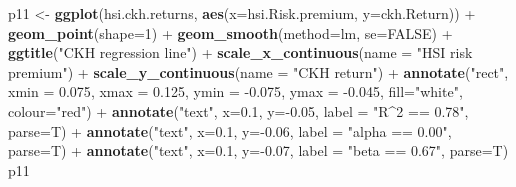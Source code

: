 \documentclass[]{article}
\newenvironment{Shaded}{\begin{snugshade}}{\end{snugshade}}
\newcommand{\KeywordTok}[1]{\textcolor[rgb]{0.13,0.29,0.53}{\textbf{{#1}}}}
\newcommand{\DataTypeTok}[1]{\textcolor[rgb]{0.13,0.29,0.53}{{#1}}}
\newcommand{\DecValTok}[1]{\textcolor[rgb]{0.00,0.00,0.81}{{#1}}}
\newcommand{\FloatTok}[1]{\textcolor[rgb]{0.00,0.00,0.81}{{#1}}}
\newcommand{\StringTok}[1]{\textcolor[rgb]{0.31,0.60,0.02}{{#1}}}
\newcommand{\OtherTok}[1]{\textcolor[rgb]{0.56,0.35,0.01}{{#1}}}
\newcommand{\NormalTok}[1]{{#1}}
\begin{document}
\begin{Shaded}
\begin{Highlighting}[]
\NormalTok{p11 <-}\StringTok{ }\KeywordTok{ggplot}\NormalTok{(hsi.ckh.returns, }\KeywordTok{aes}\NormalTok{(}\DataTypeTok{x=}\NormalTok{hsi.Risk.premium, }\DataTypeTok{y=}\NormalTok{ckh.Return)) +}\StringTok{ }
\StringTok{  }\KeywordTok{geom_point}\NormalTok{(}\DataTypeTok{shape=}\DecValTok{1}\NormalTok{) +}\StringTok{ }\KeywordTok{geom_smooth}\NormalTok{(}\DataTypeTok{method=}\NormalTok{lm, }\DataTypeTok{se=}\OtherTok{FALSE}\NormalTok{) +}
\StringTok{  }\KeywordTok{ggtitle}\NormalTok{(}\StringTok{"CKH regression line"}\NormalTok{) +}
\StringTok{  }\KeywordTok{scale_x_continuous}\NormalTok{(}\DataTypeTok{name =} \StringTok{"HSI risk premium"}\NormalTok{) +}
\StringTok{  }\KeywordTok{scale_y_continuous}\NormalTok{(}\DataTypeTok{name =} \StringTok{"CKH return"}\NormalTok{) +}
\StringTok{  }\KeywordTok{annotate}\NormalTok{(}\StringTok{"rect"}\NormalTok{, }\DataTypeTok{xmin =} \FloatTok{0.075}\NormalTok{, }\DataTypeTok{xmax =} \FloatTok{0.125}\NormalTok{, }\DataTypeTok{ymin =} \NormalTok{-}\FloatTok{0.075}\NormalTok{, }\DataTypeTok{ymax =} \NormalTok{-}\FloatTok{0.045}\NormalTok{, }\DataTypeTok{fill=}\StringTok{"white"}\NormalTok{, }
    \DataTypeTok{colour=}\StringTok{"red"}\NormalTok{) +}\StringTok{ }
\StringTok{  }\KeywordTok{annotate}\NormalTok{(}\StringTok{"text"}\NormalTok{, }\DataTypeTok{x=}\FloatTok{0.1}\NormalTok{, }\DataTypeTok{y=}\NormalTok{-}\FloatTok{0.05}\NormalTok{, }\DataTypeTok{label =} \StringTok{"R^2 == 0.78"}\NormalTok{, }\DataTypeTok{parse=}\NormalTok{T) +}\StringTok{ }\KeywordTok{annotate}\NormalTok{(}\StringTok{"text"}\NormalTok{, }\DataTypeTok{x=}\FloatTok{0.1}\NormalTok{, }\DataTypeTok{y=}\NormalTok{-}\FloatTok{0.06}\NormalTok{, }
    \DataTypeTok{label =} \StringTok{"alpha == 0.00"}\NormalTok{, }\DataTypeTok{parse=}\NormalTok{T) +}\StringTok{ }
\StringTok{  }\KeywordTok{annotate}\NormalTok{(}\StringTok{"text"}\NormalTok{, }\DataTypeTok{x=}\FloatTok{0.1}\NormalTok{, }\DataTypeTok{y=}\NormalTok{-}\FloatTok{0.07}\NormalTok{, }\DataTypeTok{label =} \StringTok{"beta == 0.67"}\NormalTok{, }\DataTypeTok{parse=}\NormalTok{T)}
\NormalTok{p11}
\end{Highlighting}
\end{Shaded}
\end{document}
